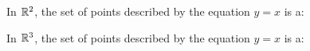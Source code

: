 \documentclass{ximera}
\author{Jim Talamo and Bart Snapp}
\begin{document}
\begin{exercise}
  In $\mathbb R^2$, the set of points described by the equation
  $y=x$ is a:
  \begin{multipleChoice}
  \end{multipleChoice}
  \begin{exercise}
  In $\mathbb R^3$, the set of points described by the equation $y=x$ is a:
  \begin{multipleChoice}
  \end{multipleChoice}
\end{exercise}
\end{exercise}
\end{document}
